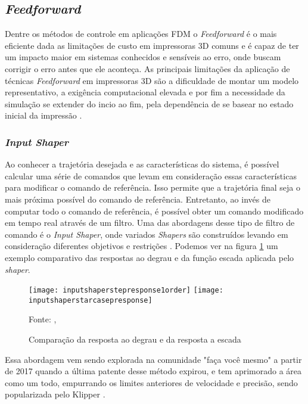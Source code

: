 \subsection{\textit{Feedforward}}
Dentre os métodos de controle em aplicações FDM o \textit{Feedforward} 
é o mais eficiente dada as limitações de custo em impressoras 
3D comuns e é capaz de ter um impacto maior em sistemas 
conhecidos e sensíveis ao erro, onde buscam corrigir o erro 
antes que ele aconteça. As principais limitações da aplicação de técnicas \textit{Feedforward}
em impressoras 3D são a dificuldade de montar um modelo representativo,
a exigência computacional elevada e por fim a necessidade da simulação
se extender do incio ao fim, pela dependência de se basear no estado 
inicial da impressão \cite{ramani20,duan18}.

\subsubsection{\textit{Input Shaper}}
Ao conhecer a trajetória desejada e as características do sistema, é possível calcular uma série de 
comandos que levam em consideração essas características para modificar o comando de referência. 
Isso permite que a trajetória final seja o mais próxima possível do comando de referência. 
Entretanto, ao invés de 
computar todo o comando de referência, é possível obter um 
comando modificado em tempo real através de um filtro. 
Uma das abordagens desse tipo de filtro de comando é o 
\textit{Input Shaper}, onde variados \textit{Shapers} são construídos levando 
em consideração diferentes objetivos e restrições 
\cite{singhose97}.
Podemos
ver na figura \ref{fig:degr_vs_esc} um exemplo comparativo
das respostas ao degrau e da função escada aplicada pelo \textit{shaper}.

\begin{figure}[!htb]
    \centering
    \caption{Comparação da resposta ao degrau e da resposta a escada}
    \texttt{[image: inputshaperstepresponse1order]}
    \texttt{[image: inputshaperstarcasepresponse]}

    {\footnotesize Fonte: \citeauthor{singhose97}, \citeyear{singhose97}}
    \label{fig:degr_vs_esc}
\end{figure}

Essa abordagem vem sendo explorada na comunidade "faça você mesmo" a partir de 2017 
quando a última patente desse método expirou, e tem aprimorado a área como
um todo, empurrando os limites anteriores de velocidade e precisão,
sendo popularizada pelo Klipper \cite{klipperkinematic}.

